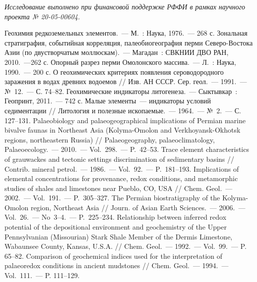 \textit{Исследование выполнено при финансовой поддержке РФФИ в рамках научного проекта № 20-05-00604.}


\begin{thebibliography}{99}
\bibitem{} Геохимия редкоземельных элементов.~--- М.~: Наука, 1976.~--- 268 с.
\bibitem{} Зональная стратиграфия, событийная корреляция, палеобиогеография перми Северо-Востока Азии (по двустворчатым моллюскам).~--- Магадан~: СВКНИИ ДВО РАН, 2010.~---262 с.
\bibitem{} Опорный разрез перми Омолонского массива.~--- Л.~: Наука, 1990.~--- 200 с.
\bibitem{} О геохимических критериях появления сероводородного заражения в водах древних водоемов // Изв. АН СССР. Сер. геол.~--- 1991.~--- №~12.~--- С. 74--82.
\bibitem{} Геохимические индикаторы литогенеза.~--- Сыктывкар~: Геопринт, 2011.~--- 742 с.
\bibitem{} Малые элементы~--- индикаторы условий седиментации // Литология и полезные ископаемые.~--- 1964.~--- №~2.~--- С. 127--131.
\bibitem{} Palaeobiology and palaeogeographical implications of Permian marine bivalve faunas in Northeast Asia (Kolyma-Omolon and Verkhoyansk-Okhotsk regions, northeastern Russia) // Palaeogeography, palaeoclimatology, Palaeoecology.~--- 2010.~--- Vol.~298.~--- P.~42--53.
\bibitem{} Trace element characteristics of grauwackes and tectonic settings discrimination of sedimentary basins // Contrib. mineral petrol.~--- 1986.~--- Vol.~92.~--- P.~181--193.
\bibitem{} Implications of elemental concentrations for provenance, redox conditions, and metamorphic studies of shales and limestones near Pueblo, CO, USA // Chem. Geol.~--- 2002.~--- Vol.~191.~--- P.~305--327.
\bibitem{} The Permian biostratigraphy of the Kolyma-Omolon region, Northeast Asia // Journ. of Asian Earth Sciences.~--- 2006.~--- Vol.~26.~--- No~3--4.~--- P.~225--234.
\bibitem{} Relationship between inferred redox potential of the depositional environment and geochemistry of the Upper Pennsylvanian (Missourian) Stark Shale Member of the Dermis Limestone, Wabaunsee County, Kansas, U.S.A. // Chem. Geol.~--- 1992.~--- Vol.~99.~--- P. 65--82.
\bibitem{} Comparison of geochemical indices used for the interpretation of palaeoredox conditions in ancient mudstones // Chem. Geol.~--- 1994.~--- Vol.~111.~--- P. 111--129.

\end{thebibliography}
